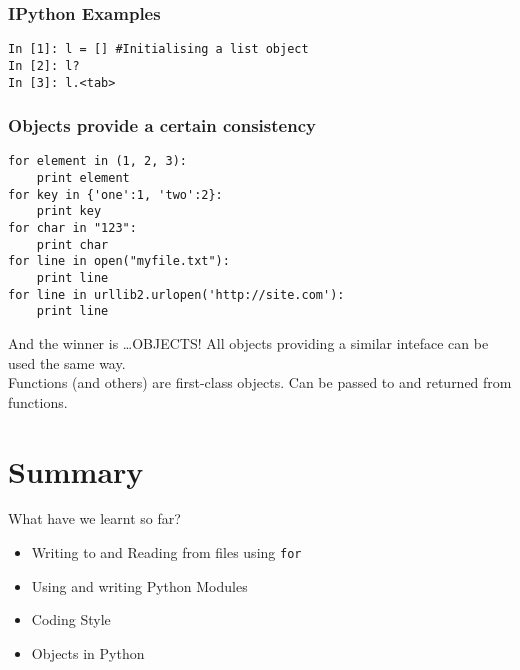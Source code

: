 \documentclass[14pt,compress]{beamer}
\newcounter{time}
\newcommand{\inctime}[1]{\addtocounter{time}{#1}{\tiny \thetime\ m}}
\newcommand{\typ}[1]{\texttt{#1}}
\begin{document}
\begin{frame}[fragile]
  \frametitle{IPython Examples}
  \begin{lstlisting}
In [1]: l = [] #Initialising a list object
In [2]: l?
In [3]: l.<tab>
  \end{lstlisting}
\end{frame}

\begin{frame}[fragile]
  \frametitle{Objects provide a certain consistency}
  \small
  \begin{lstlisting}
for element in (1, 2, 3):
    print element
for key in {'one':1, 'two':2}:
    print key
for char in "123":
    print char
for line in open("myfile.txt"):
    print line
for line in urllib2.urlopen('http://site.com'):
    print line
  \end{lstlisting}
\end{frame}

\begin{frame}{And the winner is \ldots OBJECTS!}
  All objects providing a similar inteface can be used the same way.\\
  Functions (and others) are first-class objects. Can be passed to and returned from functions.
  \inctime{10}
\end{frame}

\section{Summary}

\begin{frame}{What have we learnt so far?}
  \begin{itemize}
  \item Writing to and Reading from files using \typ{for}
  \item Using and writing Python Modules
  \item Coding Style
  \item Objects in Python
  \end{itemize}
\end{frame}
\end{document}
